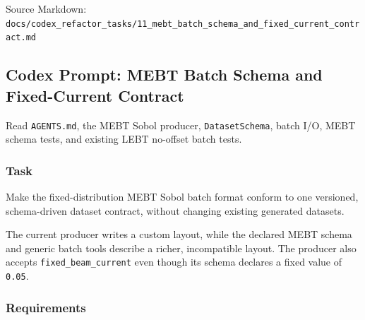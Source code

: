 \documentclass[
]{article}
\begin{document}
Source Markdown:
\texttt{docs/codex\_refactor\_tasks/11\_mebt\_batch\_schema\_and\_fixed\_current\_contract.md}

\hypertarget{codex-prompt-mebt-batch-schema-and-fixed-current-contract}{%
\subsection{Codex Prompt: MEBT Batch Schema and Fixed-Current
Contract}\label{codex-prompt-mebt-batch-schema-and-fixed-current-contract}}

Read \texttt{AGENTS.md}, the MEBT Sobol producer,
\texttt{DatasetSchema}, batch I/O, MEBT schema tests, and existing LEBT
no-offset batch tests.

\hypertarget{task-10}{%
\subsubsection{Task}\label{task-10}}

Make the fixed-distribution MEBT Sobol batch format conform to one
versioned, schema-driven dataset contract, without changing existing
generated datasets.

The current producer writes a custom layout, while the declared MEBT
schema and generic batch tools describe a richer, incompatible layout.
The producer also accepts \texttt{fixed\_beam\_current} even though its
schema declares a fixed value of \texttt{0.05}.

\hypertarget{requirements-10}{%
\subsubsection{Requirements}\label{requirements-10}}
\end{document}
